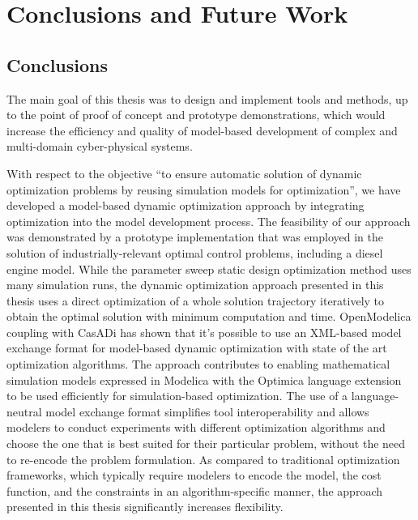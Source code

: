 
\chapter{Conclusions and Future Work}
\label{cha:conclusionsandfuturework}

\section{Conclusions}
\label{sec:conclusions}

The main goal of this thesis was to design and implement tools and methods, up to the point of proof of concept and prototype demonstrations, which would increase the efficiency and quality of model-based development of complex and multi-domain cyber-physical systems.

With respect to the objective “to ensure automatic solution of dynamic optimization problems by reusing simulation models for optimization”, we have developed a model-based dynamic optimization approach by integrating optimization into the model development process. The feasibility of our approach was demonstrated by a prototype implementation that was employed in the solution of industrially-relevant optimal control problems, including a diesel engine model. While the parameter sweep static design optimization method uses many simulation runs, the dynamic optimization approach presented in this thesis uses a direct optimization of a whole solution trajectory iteratively to obtain the optimal solution with minimum computation and time. OpenModelica coupling with CasADi has shown that it’s possible to use an XML-based model exchange format for model-based dynamic optimization with state of the art optimization algorithms. The approach contributes to enabling mathematical simulation models expressed in Modelica with the Optimica language extension to be used efficiently for simulation-based optimization. The use of a language-neutral model exchange format simplifies tool interoperability and allows modelers to conduct experiments with different optimization algorithms and choose the one that is best suited for their particular problem, without the need to re-encode the problem formulation. As compared to traditional optimization frameworks, which typically require modelers to encode the model, the cost function, and the constraints in an algorithm-specific manner, the approach presented in this thesis significantly increases flexibility.  

